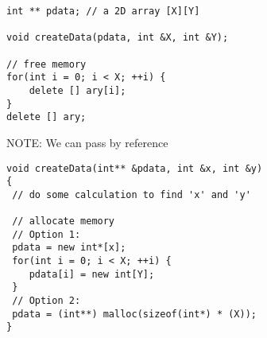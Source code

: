 \begin{lstlisting}
int ** pdata; // a 2D array [X][Y]

void createData(pdata, int &X, int &Y); 

// free memory
for(int i = 0; i < X; ++i) {
    delete [] ary[i];
}
delete [] ary;

\end{lstlisting}

NOTE: We can pass by reference
\begin{verbatim}
void createData(int** &pdata, int &x, int &y)
{
 // do some calculation to find 'x' and 'y'
 
 // allocate memory
 // Option 1:
 pdata = new int*[x];
 for(int i = 0; i < X; ++i) {
    pdata[i] = new int[Y];
 }
 // Option 2:
 pdata = (int**) malloc(sizeof(int*) * (X));
}

\end{verbatim}